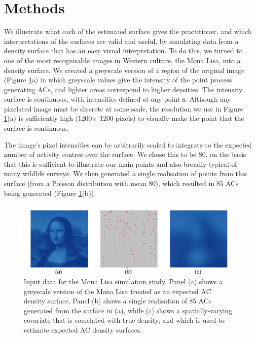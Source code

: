 \documentclass[useAMS,usenatbib,referee]{biom}
\begin{document}
\section{Methods}

We illustrate what each of the estimated surface gives the practitioner, and which interpretations of the surfaces are valid and useful, by simulating data from a density surface that has an easy visual interpretation. To do this, we turned to one of the most recognisable images in Western culture, the Mona Lisa, into a density surface. We created a greyscale version of a region of the original image (Figure \ref{mlinputs}a) in which greyscale values give the intensity of the point process generating ACs, and lighter areas correspond to higher densities. The intensity surface is continuous, with intensities defined at any point $\bm{s}$. Although any pixelated image must be discrete at some scale, the resolution we use in Figure \ref{mlinputs}(a) is sufficiently high (1200$\times$ 1200 pixels) to visually make the point that the surface is continuous.  

The image's pixel intensities can be arbitrarily scaled to integrate to the expected number of activity centres over the surface. We chose this to be 80, on the basis that this is sufficient to illustrate our main points and also broadly typical of many wildlife surveys. We then generated a single realisation of points from this surface (from a Poisson distribution with mean 80), which resulted in 85 ACs being generated (Figure \ref{mlinputs}(b)).

\begin{figure}[htbp]
\centering
\includegraphics[width=1\textwidth]{mona_inputdata.png}
\caption{Input data for the Mona Lisa simulation study. Panel (a) shows a greyscale version of the Mona Lisa treated as an expected AC density surface. Panel (b) shows a single realisation of 85 ACs generated from the surface in (a), while (c) shows a spatially-varying covariate that is correlated with true density, and which is used to estimate expected AC density surfaces.}
\label{mlinputs}
\end{figure}
\end{document}
